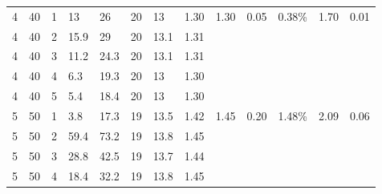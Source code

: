 \documentclass[a4paper]{article}
\newcommand{\grayrow}{\rowcolor[gray]{0.925}}
\begin{document}
\begin{table}
\begin{tabularx}{\textwidth}{ X X X X X X X X X X X X X }
        4 & 40 & 1 & 13 & 26 & 20 & 13 & 1.30  & 1.30  & 0.05  & 0.38\% & 1.70  & 0.01   \\ %
        \grayrow 4 & 40 & 2 & 15.9 & 29 & 20 & 13.1 & 1.31  & ~ & ~ & ~ & ~ &   \\ %
        4 & 40 & 3 & 11.2 & 24.3 & 20 & 13.1 & 1.31  & ~ & ~ & ~ & ~ &   \\ %
        \grayrow 4 & 40 & 4 & 6.3 & 19.3 & 20 & 13 & 1.30  & ~ & ~ & ~ & ~ &   \\ %
        4 & 40 & 5 & 5.4 & 18.4 & 20 & 13 & 1.30  & ~ & ~ & ~ & ~ &   \\ %
        \grayrow 5 & 50 & 1 & 3.8 & 17.3 & 19 & 13.5 & 1.42  & 1.45  & 0.20  & 1.48\% & 2.09  & 0.06   \\ %
        5 & 50 & 2 & 59.4 & 73.2 & 19 & 13.8 & 1.45  & ~ & ~ & ~ & ~ &   \\ %
        \grayrow 5 & 50 & 3 & 28.8 & 42.5 & 19 & 13.7 & 1.44  & ~ & ~ & ~ & ~ &   \\ %
        5 & 50 & 4 & 18.4 & 32.2 & 19 & 13.8 & 1.45  & ~ & ~ & ~ & ~ &   \\ \hline
    \end{tabularx}
\end{table}
\end{document}
